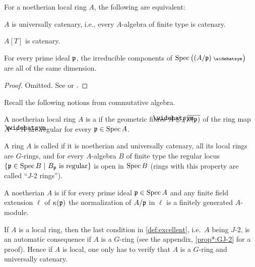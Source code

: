 \begin{thm}[Ratliff]\label{thm:universallyCatenary}
	For a noetherian local ring $A$, the following are equivalent:
	\begin{alphanumerate}
		\item $A$ is universally catenary, i.e., every $A$-algebra of finite type is catenary.
		\item $A[T]$ is catenary.
		\item For every prime ideal $\mathfrak{p}$, the irreducible components of $\Spec \big((A/\pp)^\complete\big)$ are all of the same dimension.
	\end{alphanumerate}
\end{thm}
\begin{proof}
	Omitted. See \cite[Theorem~31.7]{matsumuraCRT} or \cite[]{stacks-project}.
\end{proof}
\begin{defi}\label{def:excellent}
	Recall the following notions from commutative algebra.
	\begin{alphanumerate}
		\item A noetherian local ring $A$ is a  if the geometric fibres $\roof{A}\otimes_A\ov{\kappa(\pp)}$ of the ring map $A\morphism \roof{A}$ are regular for every $\mathfrak{p}\in\operatorname{Spec} A$.
		\item A ring $A$ is called  if it is noetherian and universally catenary, all its local rings are $G$-rings, and for every $A$-algebra $B$ of finite type the regular locus $\left\{\mathfrak{p}\in\operatorname{Spec} B\ \middle|\  B_{\mathfrak{p}}\text{ is regular}\right\}$ is open in $\operatorname{Spec} B$ (rings with this property are called \enquote{$J$-2 rings}).
		\item A noetherian $A$ is  if for every prime ideal $\mathfrak{p}\in\operatorname{Spec} A$ and any finite field extension $\ell$ of $\kappa(\mathfrak{p})$ the normalization of $A/\mathfrak{p}$ in $\ell$ is a finitely generated $A$-module.
	\end{alphanumerate}
\end{defi}
If $A$ is a local ring, then the last condition in \cref{def:excellent}, i.e.\ $A$ being $J$-2, is an automatic consequence if $A$ is a $G$-ring (see the appendix, \cref{prop*:GJ-2} for a proof). Hence if $A$ is local, one only has to verify that $A$ is a $G$-ring and universally catenary.

